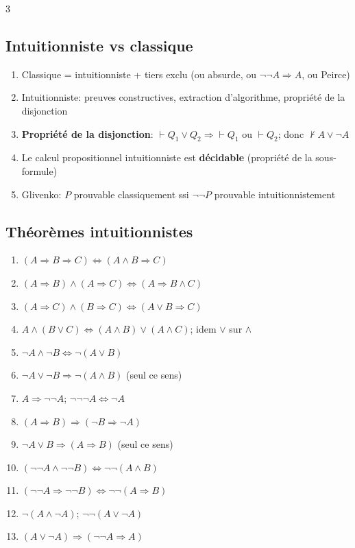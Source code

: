 \documentclass[12pt, a4paper]{article}
\newcommand{\vd}{\vdash}
\begin{document}
\begin{multicols*}{3}
	\subsection{Intuitionniste vs classique}
	\begin{enumerate}[\roman*.]
		\item Classique = intuitionniste + tiers exclu (ou absurde, ou $\neg\neg A\Rightarrow A$, ou Peirce)
		\item Intuitionniste: preuves constructives, extraction d'algorithme, propriété de la disjonction
		\item \textbf{Propriété de la disjonction}: $\vd Q_1\vee Q_2\Rightarrow\vd Q_1$ ou $\vd Q_2$; donc $\nvdash A\vee\neg A$
		\item Le calcul propositionnel intuitionniste est \textbf{décidable} (propriété de la sous-formule)
		\item Glivenko: $P$ prouvable classiquement ssi $\neg\neg P$ prouvable intuitionnistement
	\end{enumerate}

	\colbreak
	\subsection{Théorèmes intuitionnistes}
	\begin{enumerate}[\roman*.]
		\item $(A\Rightarrow B\Rightarrow C)\Leftrightarrow(A\wedge B\Rightarrow C)$
		\item $(A\Rightarrow B)\wedge(A\Rightarrow C)\Leftrightarrow(A\Rightarrow B\wedge C)$
		\item $(A\Rightarrow C)\wedge(B\Rightarrow C)\Leftrightarrow(A\vee B\Rightarrow C)$
		\item $A\wedge(B\vee C)\Leftrightarrow(A\wedge B)\vee(A\wedge C)$; idem $\vee$ sur $\wedge$
		\item $\neg A\wedge\neg B\Leftrightarrow\neg(A\vee B)$
		\item $\neg A\vee\neg B\Rightarrow\neg(A\wedge B)$ (seul ce sens)
		\item $A\Rightarrow\neg\neg A$; $\neg\neg\neg A\Leftrightarrow\neg A$
		\item $(A\Rightarrow B)\Rightarrow(\neg B\Rightarrow\neg A)$
		\item $\neg A\vee B\Rightarrow(A\Rightarrow B)$ (seul ce sens)
		\item $(\neg\neg A\wedge\neg\neg B)\Leftrightarrow\neg\neg(A\wedge B)$
		\item $(\neg\neg A\Rightarrow\neg\neg B)\Leftrightarrow\neg\neg(A\Rightarrow B)$
		\item $\neg(A\wedge\neg A)$; $\neg\neg(A\vee\neg A)$
		\item $(A\vee\neg A)\Rightarrow(\neg\neg A\Rightarrow A)$
	\end{enumerate}


\end{multicols*}
\end{document}
